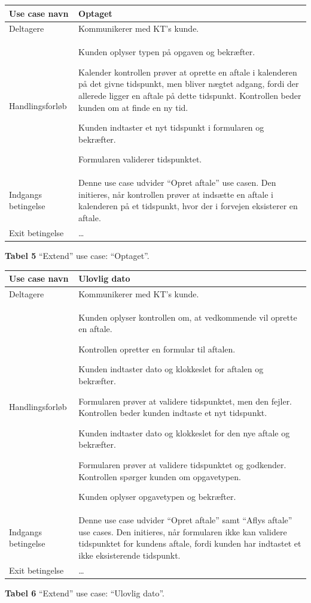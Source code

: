 \documentclass[12pt]{article}   %
\newcommand{\nextitem}{\par\hspace*{\labelsep}\textbullet\hspace*{\labelsep}}
\begin{document}
\begin{tabular}{l p{10cm}}
Use case navn & Optaget \\ \hline
Deltagere & \nextitem Kommunikerer med KT's kunde. 
            \\ \hline
Handlingsforløb &
	\nextitem Kunden oplyser typen på opgaven og bekræfter. 
	\nextitem Kalender kontrollen prøver at oprette en aftale i kalenderen
	på det givne tidspunkt, men bliver nægtet adgang, fordi der allerede
	ligger en aftale på dette tidspunkt. Kontrollen beder kunden om at
	finde en ny tid.
	\nextitem Kunden indtaster et nyt tidspunkt i formularen og bekræfter. 
	\nextitem Formularen validerer tidspunktet.
	\\ \hline
	Indgangs betingelse &
		\nextitem Denne use case udvider ``Opret aftale'' use casen.
		Den initieres, når kontrollen prøver at indsætte en aftale i
		kalenderen på et tidspunkt, hvor der i forvejen eksisterer en
		aftale. 
		\\ \hline
Exit betingelse & \dots
	\\ \hline
\end{tabular}
\begin{center}
\textbf{Tabel 5} ``Extend'' use case: ``Optaget''.       
\end{center}
\vspace{0.5cm}


\begin{tabular}{l p{10cm}}
Use case navn & Ulovlig dato \\ \hline
Deltagere & \nextitem Kommunikerer med KT's kunde.
            \\ \hline
Handlingsforløb &
	\nextitem Kunden oplyser kontrollen om, at vedkommende vil oprette en
	aftale.
	\nextitem Kontrollen opretter en formular til aftalen.
	\nextitem Kunden indtaster dato og klokkeslet for aftalen og
	bekræfter.
	\nextitem Formularen prøver at validere tidspunktet, men den fejler.
	Kontrollen beder kunden indtaste et nyt tidspunkt.
	\nextitem Kunden indtaster dato og klokkeslet for den nye aftale og
	bekræfter.
	\nextitem Formularen prøver at validere tidspunktet og godkender.
	Kontrollen spørger kunden om opgavetypen.
	\nextitem Kunden oplyser opgavetypen og bekræfter.
	\\ \hline
	Indgangs betingelse &
		\nextitem Denne use case udvider ``Opret aftale'' samt ``Aflys
		aftale'' use cases. Den initieres, når formularen ikke kan
		validere tidspunktet for kundens aftale, fordi kunden har
		indtastet et ikke eksisterende tidspunkt.  
		\\ \hline
Exit betingelse & \dots
	\\ \hline
\end{tabular}
\begin{center}
\textbf{Tabel 6} ``Extend'' use case: ``Ulovlig dato''.       
\end{center}
\vspace{0.5cm}
\end{document}

